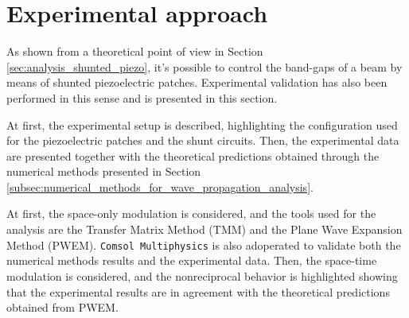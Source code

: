 \section{Experimental approach}
\label{sec:experimental_approach}

As shown from a theoretical point of view in Section \ref{sec:analysis_shunted_piezo}, it's possible to control the band-gaps of a beam by means of shunted piezoelectric patches.
Experimental validation has also been performed in this sense and is presented in this section.

At first, the experimental setup is described, highlighting the configuration used for the piezoelectric patches and the shunt circuits.
Then, the experimental data are presented together with the theoretical predictions obtained through the numerical methods presented in Section \ref{subsec:numerical_methods_for_wave_propagation_analysis}.

At first, the space-only modulation is considered, and the tools used for the analysis are the Transfer Matrix Method (TMM) and the Plane Wave Expansion Method (PWEM).
\texttt{Comsol Multiphysics} is also adoperated to validate both the numerical methods results and the experimental data.
Then, the space-time modulation is considered, and the nonreciprocal behavior is highlighted showing that the experimental results are in agreement with the theoretical predictions obtained from PWEM.




